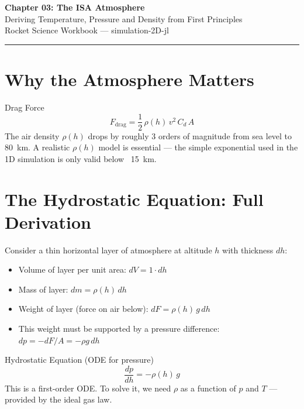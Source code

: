 \documentclass[12pt, a4paper]{article}
\begin{document}
\begin{center}
  {\LARGE \textbf{Chapter 03: The ISA Atmosphere}}\\[0.5em]
  {\large \textcolor{hintgray}{Deriving Temperature, Pressure and Density from First Principles}}\\[0.3em]
  {\small \textcolor{hintgray}{Rocket Science Workbook — simulation-2D-jl}}
\end{center}
\vspace{1em}\hrule\vspace{1.5em}

\section{Why the Atmosphere Matters}

\begin{theorybox}{Drag Force}
\[
  F_\text{drag} = \frac{1}{2}\,\rho(h)\,v^2\,C_d\,A
\]
The air density $\rho(h)$ drops by roughly 3 orders of magnitude from sea level to 80~km.
A realistic $\rho(h)$ model is essential — the simple exponential used in the 1D simulation is only valid below ~15~km.
\end{theorybox}

\section{The Hydrostatic Equation: Full Derivation}

Consider a thin horizontal layer of atmosphere at altitude $h$ with thickness $dh$:

\begin{itemize}
  \item Volume of layer per unit area: $dV = 1 \cdot dh$
  \item Mass of layer: $dm = \rho(h)\,dh$
  \item Weight of layer (force on air below): $dF = \rho(h)\,g\,dh$
  \item This weight must be supported by a pressure difference: $dp = -dF/A = -\rho g\,dh$
\end{itemize}

\begin{theorybox}{Hydrostatic Equation (ODE for pressure)}
\[
  \boxed{\frac{dp}{dh} = -\rho(h)\,g}
\]
This is a first-order ODE. To solve it, we need $\rho$ as a function of $p$ and $T$ — provided by the ideal gas law.
\end{theorybox}
\end{document}
